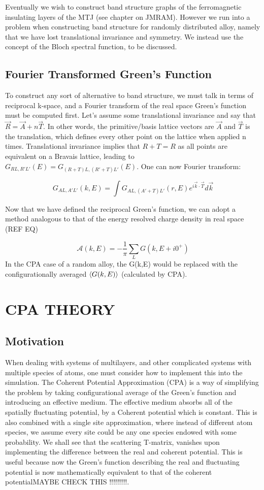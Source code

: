 \documentclass[12pt]{article}
\begin{document}
Eventually we wish to construct band structure graphs of the ferromagnetic insulating layers of the MTJ (see chapter on JMRAM). However we run into a problem when constructing band structure for randomly distributed alloy, namely that we have lost translational invariance and symmetry. We instead use the concept of the Bloch spectral function, to be discussed.

\subsection{Fourier Transformed Green's Function}

To construct any sort of alternative to band structure, we must talk in terms of reciprocal k-space, and a Fourier transform of the real space Green's function must be computed first. Let's assume some translational invariance and say that $\vec{R}=\vec{A}+n\vec{T}$. In other words, the primitive/basis lattice vectors are $\vec{A}$ and $\vec{T}$ is the translation, which defines every other point on the lattice when applied n times. Translational invariance implies that $R+T=R$ as all points are equivalent on a Bravais lattice, leading to $G_{RL,R'L'}(E)=G_{(R+T)L,(R'+T)L'}(E)$. One can now Fourier transform:

$$G_{AL,A'L'}(k,E)=\int G_{AL,(A'+T)L'}(r,E)e^{i\vec{k}\cdot \vec{T}} d\vec{k}$$

Now that we have defined the reciprocal Green's function, we can adopt a method analogous to that of the energy resolved charge density in real space (REF EQ)

$$\mathcal{A}(k,E)=-\frac{1}{\pi} \sum_L G(k,E+i0^+)$$ 
In the CPA case of a random alloy, the G(k,E) would be replaced with the configurationally averaged $\expval{G(k,E)}$ (calculated by CPA).

\section{CPA THEORY}
\subsection{Motivation}

When dealing with systems of multilayers, and other complicated systems with multiple species of atoms, one must consider how to implement this into the simulation. The Coherent Potential Approximation (CPA) is a way of simplifying the problem by taking configurational average of the Green's function and introducing an effective medium. The effective medium absorbs all of the spatially fluctuating potential, by a Coherent potential which is constant. This is also combined with a single site approximation, where instead of different atom species, we assume every site could be any one species endowed with some probability. We shall see that the scattering T-matrix, vanishes upon implementing the difference between the real and coherent potential. This is useful because now the Green's function describing the real and fluctuating potential is now mathematically equivalent to that of the coherent potentialMAYBE CHECK THIS !!!!!!!!!.
\end{document}
